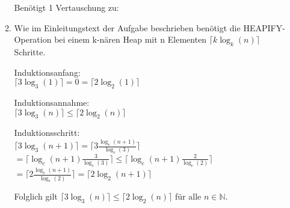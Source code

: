 \documentclass{article}
\begin{document}
\begin{enumerate}[\bfseries1.]
\begin{enumerate}
                Benötigt 1 Vertauschung zu:
                
                
            \item
                Wie im Einleitungstext der Aufgabe beschrieben benötigt die
                HEAPIFY-Operation bei einem k-nären Heap mit n Elementen
                $\lceil k\log_k(n)\rceil$ Schritte.
                
                Induktionsanfang:
                \\$\lceil 3\log_3(1)\rceil = 0 = \lceil 2\log_2(1)\rceil $
                
                Induktionsannahme:
                \\ $\lceil 3\log_3(n)\rceil \leq \lceil 2\log_2(n)\rceil $
                
                Induktionsschritt:
                \\ $\lceil 3\log_3(n+1)\rceil 
                = \lceil 3 \frac{\log_e(n+1)}{\log_e(3)}\rceil$ 
                \\$= \lceil \log_e(n+1) \frac{3}{\log_e(3)}\rceil
                \leq \lceil \log_e(n+1) \frac{2}{\log_e(2)}\rceil$ 
                \\$= \lceil 2 \frac{\log_e(n+1)}{\log_e(2)}\rceil 
                = \lceil 2\log_2(n+1)\rceil$
        
                Folglich gilt $\lceil 3\log_3(n)\rceil \leq \lceil
                2\log_2(n)\rceil $ für alle $n \in \mathbb{N}$.
        \end{enumerate}
    

\end{enumerate}
\end{document}
